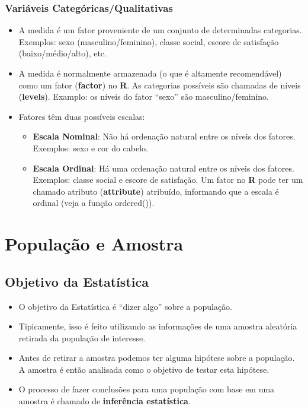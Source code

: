 \documentclass[]{article}
\providecommand{\tightlist}{%
  \setlength{\itemsep}{0pt}\setlength{\parskip}{0pt}}
\begin{document}
\subsubsection{Variáveis
Categóricas/Qualitativas}\label{variaveis-categoricasqualitativas}

\begin{itemize}
\tightlist
\item
  A medida é um fator proveniente de um conjunto de determinadas
  categorias. Exemplos: sexo (masculino/feminino), classe social, escore
  de satisfação (baixo/médio/alto), etc.
\item
  A medida é normalmente armazenada (o que é altamente recomendável)
  como um fator (\textbf{factor}) no \textbf{R}. As categorias possíveis
  são chamadas de níveis (\textbf{levels}). Examplo: os níveis do fator
  ``sexo'' são masculino/feminino.
\item
  Fatores têm duas possíveis escalas:

  \begin{itemize}
  \tightlist
  \item
    \textbf{Escala Nominal}: Não há ordenação natural entre os níveis
    dos fatores. Exemplos: sexo e cor do cabelo.
  \item
    \textbf{Escala Ordinal}: Há uma ordenação natural entre os níveis
    dos fatores. Exemplos: classe social e escore de satisfação. Um
    fator no \textbf{R} pode ter um chamado atributo
    (\textbf{attribute}) atribuído, informando que a escala é ordinal
    (veja a função ordered()).
  \end{itemize}
\end{itemize}

\section{População e Amostra}\label{populacao-e-amostra}

\subsection{Objetivo da Estatística}\label{objetivo-da-estatistica}

\begin{itemize}
\tightlist
\item
  O objetivo da Estatística é ``dizer algo'' sobre a população.
\item
  Tipicamente, isso é feito utilizando as informações de uma amostra
  aleatória retirada da população de interesse.
\item
  Antes de retirar a amostra podemos ter alguma hipótese sobre a
  população. A amostra é então analisada como o objetivo de testar esta
  hipótese.
\item
  O processo de fazer conclusões para uma população com base em uma
  amostra é chamado de \textbf{inferência estatística}.
\end{itemize}
\end{document}
